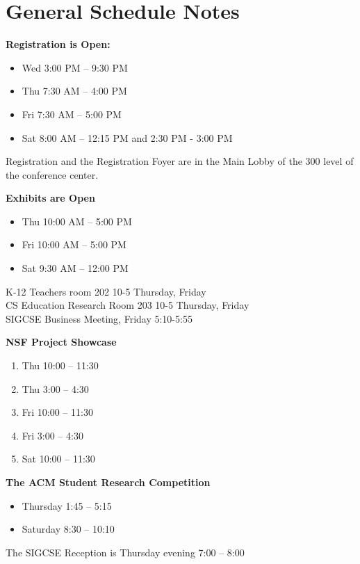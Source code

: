 \newpage
{\centering
\section*{General Schedule Notes}
}

\noindent
\textbf{Registration is Open:}
\begin{itemize}
	\item Wed 3:00 PM -- 9:30 PM
	\item Thu 7:30 AM -- 4:00 PM
	\item Fri 7:30 AM -- 5:00 PM
	\item Sat 8:00 AM -- 12:15 PM and 2:30 PM - 3:00 PM
\end{itemize}
\noindent Registration and the Registration Foyer are in the Main Lobby of the 300 level of the conference center.

\noindent
\textbf{Exhibits are Open }
\begin{itemize}
\item Thu 10:00 AM -- 5:00 PM
\item Fri 10:00 AM -- 5:00 PM
\item Sat 9:30 AM -- 12:00 PM
\end{itemize}

\noindent
K-12 Teachers room 202 10-5 Thursday, Friday \\
CS Education Research Room 203  10-5 Thursday, Friday \\
SIGCSE Business Meeting, Friday 5:10-5:55

\noindent
\textbf{NSF Project Showcase}
\begin{enumerate}
\item Thu 10:00 -- 11:30
\item Thu 3:00 -- 4:30
\item Fri 10:00 -- 11:30
\item Fri 3:00 -- 4:30
\item Sat 10:00 -- 11:30
\end{enumerate}

\noindent
\textbf{The ACM Student Research Competition}
\begin{itemize}
	\item Thursday 1:45 -- 5:15
	\item Saturday 8:30 -- 10:10
\end{itemize}

\noindent
The SIGCSE Reception is Thursday evening  7:00 -- 8:00

\newpage